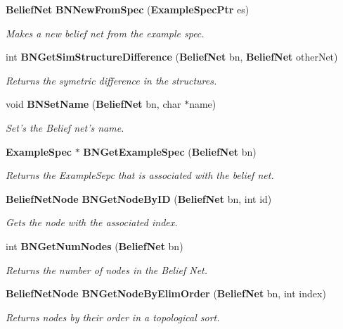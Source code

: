\begin{CompactItemize}
{\bf Belief\-Net} {\bf BNNew\-From\-Spec} ({\bf Example\-Spec\-Ptr} es)
\begin{CompactList}\small\item\em Makes a new belief net from the example spec. \item\end{CompactList}\item 
int {\bf BNGet\-Sim\-Structure\-Difference} ({\bf Belief\-Net} bn, {\bf Belief\-Net} other\-Net)
\begin{CompactList}\small\item\em Returns the symetric difference in the structures. \item\end{CompactList}\item 
void {\bf BNSet\-Name} ({\bf Belief\-Net} bn, char $\ast$name)
\begin{CompactList}\small\item\em Set's the Belief net's name. \item\end{CompactList}\item 
{\bf Example\-Spec} $\ast$ {\bf BNGet\-Example\-Spec} ({\bf Belief\-Net} bn)
\begin{CompactList}\small\item\em Returns the Example\-Sepc that is associated with the belief net. \item\end{CompactList}\item 
{\bf Belief\-Net\-Node} {\bf BNGet\-Node\-By\-ID} ({\bf Belief\-Net} bn, int id)
\begin{CompactList}\small\item\em Gets the node with the associated index. \item\end{CompactList}\item 
int {\bf BNGet\-Num\-Nodes} ({\bf Belief\-Net} bn)
\begin{CompactList}\small\item\em Returns the number of nodes in the Belief Net. \item\end{CompactList}\item 
{\bf Belief\-Net\-Node} {\bf BNGet\-Node\-By\-Elim\-Order} ({\bf Belief\-Net} bn, int index)
\begin{CompactList}\small\item\em Returns nodes by their order in a topological sort. \item\end{CompactList}\item 

\end{CompactItemize}
